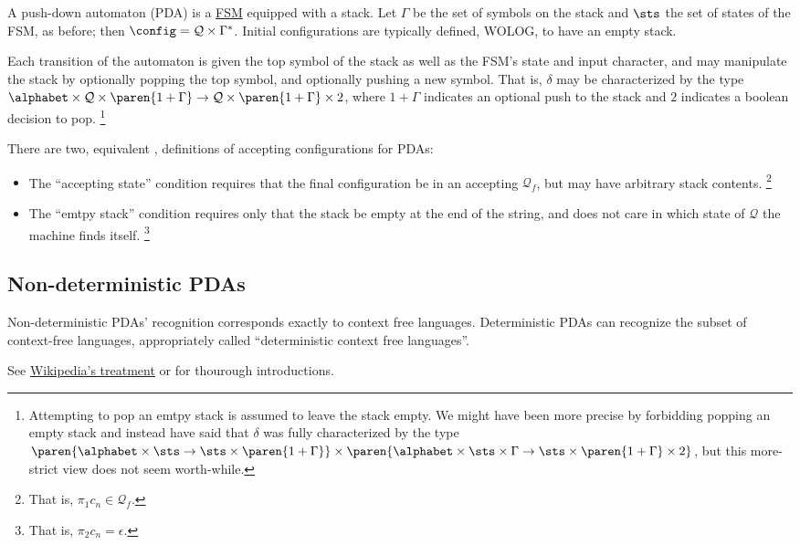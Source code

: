 A push-down automaton (PDA) is a \hyperref[sec:zoo-str/fsm]{FSM} equipped
with a stack.  Let $\Gamma$ be the set of symbols on the stack and $\sts$
the set of states of the FSM, as before; then $\config = \mathcal{Q} \times
\Gamma^*$.  Initial configurations are typically defined, WOLOG, to have an
empty stack.

Each transition of the automaton is given the top symbol of the
stack as well as the FSM's state and input character, and may manipulate the
stack by optionally popping the top symbol, and optionally pushing a new
symbol.  That is, $\delta$ may be characterized by the type $\alphabet
\times \mathcal{Q} \times \paren{1 + \Gamma} \to \mathcal{Q} \times
\paren{1 + \Gamma} \times 2$, where $1 + \Gamma$ indicates an optional push
to the stack and $2$ indicates a boolean decision to pop.%
%
\footnote{Attempting to pop an emtpy stack is assumed to leave the stack
empty.  We might have been more precise by forbidding popping an empty stack
and instead have said that $\delta$ was fully characterized by the type
$\paren{\alphabet \times \sts \to \sts \times \paren{1 + \Gamma}} \times
\paren{\alphabet \times \sts \times \Gamma \to \sts \times \paren{1 + \Gamma}
\times 2}$, but this more-strict view does not seem worth-while.}
%

There are two, equivalent \cite{xxx}, definitions of accepting
configurations for PDAs:
%
\begin{itemize}
%
    \item The ``accepting state'' condition requires that the final
    configuration be in an accepting $\mathcal{Q}_f$, but may have arbitrary stack
    contents.%
    \footnote{That is, $\pi_1 c_n \in \mathcal{Q}_f$.}
%
    \item The ``emtpy stack'' condition requires only that the stack be
    empty at the end of the string, and does not care in which state of
    $\mathcal{Q}$ the machine finds itself.
    \footnote{That is, $\pi_2 c_n = \epsilon$.}
%
\end{itemize}


\subsection{Non-deterministic PDAs}
\label{sec:zoo-str/pda-nd}

Non-deterministic PDAs' recognition corresponds exactly to context free languages.
Deterministic PDAs can recognize the subset of context-free languages,
appropriately called ``deterministic context free languages''.

See \href{http://wikipedia.org/Push-down\_automaton}{Wikipedia's treatment}
or \cite[Ch. 2]{sipser:theorycomp} for thourough introductions.


